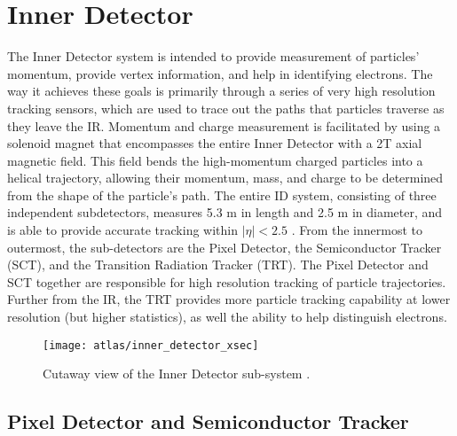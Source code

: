 \section{Inner Detector} \label{sec:inner_detector}
    
    The Inner Detector system is intended to provide measurement of particles' momentum, provide vertex information, and help in identifying electrons.
    The way it achieves these goals is primarily through a series of very high resolution tracking sensors, which are used to trace out the paths that particles traverse as they leave the IR. 
    Momentum and charge measurement is facilitated by using a solenoid magnet that encompasses the entire Inner Detector with a 2T axial magnetic field.
    This field bends the high-momentum charged particles into a helical trajectory, allowing their momentum, mass, and charge to be determined from the shape of the particle's path.
    The entire ID system, consisting of three independent subdetectors, measures 5.3 m in length and 2.5 m in diameter,
        and is able to provide accurate tracking within $|\eta| < 2.5$ \cite{id_tdr}.
    From the innermost to outermost, the sub-detectors are the Pixel Detector, the Semiconductor Tracker (SCT),
        and the Transition Radiation Tracker (TRT).
    The Pixel Detector and SCT together are responsible for high resolution tracking of particle trajectories.
    Further from the IR, the TRT provides more particle tracking capability at lower resolution (but higher statistics), as well the ability to help distinguish electrons. 

    \begin{figure}[h]
        \texttt{[image: atlas/inner\_detector\_xsec]}
        \caption{Cutaway view of the Inner Detector sub-system \cite{atlas_tdr}.}
        \label{fig:inner_detector_xsec}
    \end{figure}

    


    \subsection{Pixel Detector and Semiconductor Tracker}

